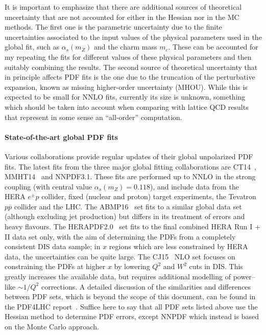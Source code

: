 It is important to emphasize that there are additional sources of theoretical
uncertainty that are not accounted for either in the Hessian nor
in the MC methods.
%
The first one is the parametric uncertainty due to the finite uncertainties associated
to the input values of the physical parameters used in the global fit, such
as $\alpha_s(m_Z)$ and the charm mass $m_c$.
%
These can be accounted for my repeating the fits for different values of these
physical parameters and then suitably combining the results.
%
The second source of theoretical uncertainty that in principle affects PDF fits
is the one due to the truncation of the perturbative expansion, known
as missing higher-order uncertainty (MHOU).
%
While this is expected to be small for NNLO fits, currently its size is unknown,
something which should be taken into account when comparing with lattice
QCD results that represent in some sense an ``all-order'' computation.

\paragraph{State-of-the-art global PDF fits}
%
Various collaborations provide regular updates of their global unpolarized
PDF fits.
%
The latest fits from the three major global fitting collaborations
are CT14~\cite{Dulat:2015mca}, MMHT14~\cite{Harland-Lang:2014zoa} and NNPDF3.1.
%
These fits are performed up to NNLO in the strong coupling (with central value
$\alpha_s(m_Z)=0.118$),
and include data from the HERA $e^{\pm} p$ collider, fixed (nuclear and proton) target experiments, the Tevatron $p\overline{p}$ collider and the LHC. 
%
The ABMP16~\cite{Alekhin:2017kpj} set fits to a similar global data set
(although excluding jet production)
but differs in its treatment of errors and heavy flavours.
%
The HERAPDF2.0~\cite{Abramowicz:2015mha} set fits to the final combined HERA Run I + II data set only, with the aim of determining the PDFs from a completely consistent DIS data sample; in $x$ regions which are less constrained by HERA data, the uncertainties can be quite large. The CJ15~\cite{Accardi:2016qay} NLO set focuses on constraining the PDFs at higher $x$ by lowering $Q^2$ and $W^2$ cuts in DIS. This greatly increases the available data, but requires additional modelling of power--like $\sim 1/Q^2$ corrections.
%
A detailed discussion of the similarities and differences between
PDF sets, which is beyond the scope of this
document,
can be found in the PDF4LHC report~\cite{Butterworth:2015oua}.
%
Suffice here to say that all PDF sets listed above use the Hessian
method to determine PDF errors, except NNPDF which instead
is based on the Monte Carlo approach.

